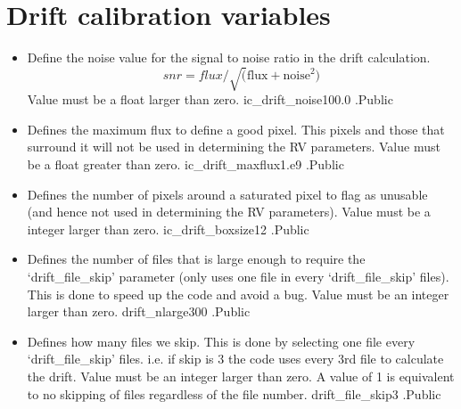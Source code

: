 \clearpage
\newpage
\section{Drift calibration variables}
\label{ch:variables:drift}

\begin{itemize}


\item {}
{Define the noise value for the signal to noise ratio in the drift calculation.
\begin{equation}
snr = flux/\sqrt(\text{flux} + \text{noise}^2)
\end{equation}
Value must be a float larger than zero.
}
{ic\_drift\_noise}{100.0}
{\calDRIFTRAW}{\constantsfile}{\calDRIFTRAW.\progMAIN}{Public}


\item {}
{Defines the maximum flux to define a good pixel. This pixels and those that surround it will not be used in determining the RV parameters. Value must be a float greater than zero.}
{ic\_drift\_maxflux}{1.e9}
{\calDRIFTRAW}{\constantsfile}{\calDRIFTRAW.\progMAIN}{Public}


\item {}
{Defines the number of pixels around a saturated pixel to flag as unusable (and hence not used in determining the RV parameters). Value must be a integer larger than zero.}
{ic\_drift\_boxsize}{12}
{\calDRIFTRAW}{\constantsfile}{\calDRIFTRAW.\progMAIN}{Public}


\item {}
{Defines the number of files that is large enough to require the `drift\_file\_skip' parameter (only uses one file in every `drift\_file\_skip' files). This is done to speed up the code and avoid a bug. Value must be an integer larger than zero.}
{drift\_nlarge}{300}
{\calDRIFTRAW}{\constantsfile}{\calDRIFTRAW.\progMAIN}{Public}


\item {}
{Defines how many files we skip. This is done by selecting one file every `drift\_file\_skip' files. i.e. if skip is 3 the code uses every 3rd file to calculate the drift. Value must be an integer larger than zero. A value of 1 is equivalent to no skipping of files regardless of the file number.}
{drift\_file\_skip}{3}
{\calDRIFTRAW}{\constantsfile}{\calDRIFTRAW.\progMAIN}{Public}



\end{itemize}
